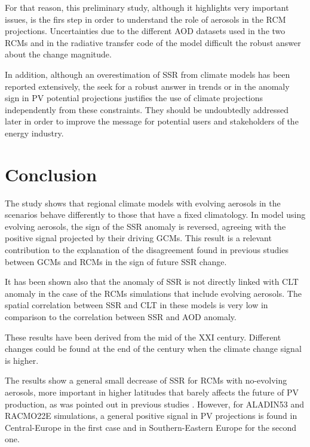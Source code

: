 For that reason, this preliminary study, although it highlights very important issues, is the firs step in order to understand the role of aerosols in the RCM projections. Uncertainties due to the different AOD datasets used in the two RCMs and in the radiative transfer code of the model difficult the robust answer about the change magnitude. 

In addition, although an overestimation of SSR from climate models has been reported extensively, the seek for a robust answer in trends or in the anomaly sign in PV potential projections justifies the use of climate projections independently from these constraints. They should be undoubtedly addressed later in order to improve the message for potential users and stakeholders of the energy industry.

\section{Conclusion}

The study shows that regional climate models with evolving aerosols in the scenarios behave differently to those that have a fixed climatology. In model using evolving aerosols, the sign of the SSR anomaly is reversed, agreeing with the positive signal projected by their driving GCMs. This result is a relevant contribution to the explanation of the disagreement found in previous studies between GCMs and RCMs in the sign of future SSR change.

It has been shown also that the anomaly of SSR is not directly linked with CLT anomaly in the case of the RCMs simulations that include evolving aerosols. The spatial correlation between SSR and CLT in these models is very low in comparison to the correlation between SSR and AOD anomaly.

These results have been derived from the mid of the XXI century. Different changes could be found at the end of the century when the climate change signal is higher.

The results show a general small decrease of SSR for RCMs with no-evolving aerosols, more important in higher latitudes that barely affects the future of PV production, as was pointed out in previous studies \cite*{Jerez2015, Jerez2019}. However, for ALADIN53 and RACMO22E simulations, a general positive signal in PV projections is found in Central-Europe in the first case and in Southern-Eastern Europe for the second one.

